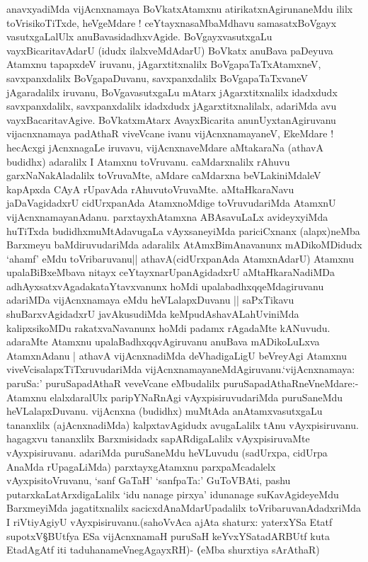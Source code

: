 \begin{artha}
anavxyadiMda vijAcnxnamaya BoVkatxAtamxnu atirikatxnAgirunaneMdu ililx
toVrisikoTiTxde, heVgeMdare ! ceYtayxnasaMbaMdhavu samasatxBoVgayx
vasutxgaLalUlx anuBavasidadhxvAgide. BoVgayxvasutxgaLu
vayxBicaritavAdarU (idudx ilalxveMdAdarU) BoVkatx anuBava paDeyuva
Atamxnu tapapxdeV iruvanu, jAgarxtitxnalilx BoVgapaTaTxAtamxneV,
savxpanxdalilx BoVgapaDuvanu, savxpanxdalilx BoVgapaTaTxvaneV
jAgaradalilx iruvanu, BoVgavasutxgaLu mAtarx jAgarxtitxnalilx
idadxdudx savxpanxdalilx, savxpanxdalilx idadxdudx jAgarxtitxnalilalx,
adariMda avu vayxBacaritavAgive. BoVkatxmAtarx AvayxBicarita
anunUyxtanAgiruvanu vijacnxnamaya padAthaR viveVcane ivanu
vijAcnxnamayaneV, EkeMdare ! hecAcxgi jAcnxnagaLe iruvavu,
vijAcnxnaveMdare aMtakaraNa (athavA budidhx) adaralilx I Atamxnu
toVruvanu. caMdarxnalilx rAhuvu garxNaNakAladalilx toVruvaMte, aMdare
caMdarxna beVLakiniMdaleV kapApxda CAyA rUpavAda
rAhuvutoVruvaMte. aMtaHkaraNavu jaDaVagidadxrU cidUrxpanAda
AtamxnoMdige toVruvudariMda AtamxnU
vijAcnxnamayanAdanu. parxtayxhAtamxna ABAsavuLaLx avideyxyiMda
huTiTxda budidhxmuMtAdavugaLa vAyxsaneyiMda pariciCxnanx (alapx)neMba
Barxmeyu baMdiruvudariMda adaralilx AtAmxBimAnavanunx mADikoMDidudx
`ahamf' eMdu toVribaruvanu|| athavA(cidUrxpanAda AtamxnAdarU) Atamxnu
upalaBiBxeMbava nitayx ceYtayxnarUpanAgidadxrU aMtaHkaraNadiMDa
adhAyxsatxvAgadakataYtavxvanunx hoMdi upalabadhxqqeMdagiruvanu
adariMDa vijAcnxnamaya eMdu heVLalapxDuvanu || saPxTikavu
shuBarxvAgidadxrU javAkusudiMda keMpudAshavALahUviniMda kalipxsikoMDu
rakatxvaNavanunx hoMdi padamx rAgadaMte kANuvudu. adaraMte Atamxnu
upalaBadhxqqvAgiruvanu anuBava mADikoLuLxva AtamxnAdanu | athavA
vijAcnxnadiMda deVhadigaLigU beVreyAgi Atamxnu
viveVcisalapxTiTxruvudariMda
vijAcnxnamayaneMdAgiruvanu.`vijAcnxnamaya: paruSa:' puruSapadAthaR
veveVcane eMbudalilx puruSapadAthaRneVneMdare:- Atamxnu elalxdaralUlx
paripYNaRnAgi vAyxpisiruvudariMda puruSaneMdu
heVLalapxDuvanu. vijAcnxna (budidhx) muMtAda anAtamxvasutxgaLu
tananxlilx (ajAcnxnadiMda) kalpxtavAgidudx avugaLalilx tAnu
vAyxpisiruvanu. hagagxvu tananxlilx Barxmisidadx sapARdigaLalilx
vAyxpisiruvaMte vAyxpisiruvanu. adariMda puruSaneMdu heVLuvudu
(sadUrxpa, cidUrpa AnaMda rUpagaLiMda) parxtayxgAtamxnu
parxpaMcadalelx vAyxpisitoVruvanu, `sanf GaTaH' `sanfpaTa:' GuToVBAti,
pashu putarxkaLatArxdigaLalilx `idu nanage pirxya' idunanage
suKavAgideyeMdu BarxmeyiMda jagatitxnalilx sacicxdAnaMdarUpadalilx
toVribaruvanAdadxriMda I riVtiyAgiyU vAyxpisiruvanu.(sahoVvAca ajAta
shaturx: yaterxYSa Etatf supotxV\S BUtfya ESa vijAcnxnamaH puruSaH
keYvxYSatadARBUtf kuta EtadAgAtf iti taduhanameVnegAgayxRH)-
\textbf(eMba shurxtiya sArAthaR)
\end{artha}

